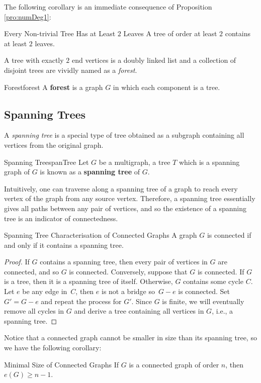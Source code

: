 \documentclass[math]{amznotes}
\theoremstyle{remark}
\newcommand{\0}{\mathbf{0}}
\newcommand{\1}{\mathbf{1}}
\begin{document}
The following corollary is an immediate consequence of Proposition \ref{pro:numDeg1}:
\begin{corbox}{Every Non-trivial Tree Has at Least $2$ Leaves}{}
    A tree of order at least $2$ contains at least $2$ leaves.
\end{corbox}
A tree with exactly $2$ end vertices is a doubly linked list and a collection of disjoint trees are vividly named as a \textit{forest}.
\begin{dfnbox}{Forest}{forest}
    A {\color{red} \textbf{forest}} is a graph $G$ in which each component is a tree.
\end{dfnbox}

\subsection{Spanning Trees}
A \textit{spanning tree} is a special type of tree obtained as a subgraph containing all vertices from the original graph.
\begin{dfnbox}{Spanning Tree}{spanTree}
    Let $G$ be a multigraph, a tree $T$ which is a spanning graph of $G$ is known as a {\color{red} \textbf{spanning tree}} of $G$.
\end{dfnbox}
Intuitively, one can traverse along a spanning tree of a graph to reach every vertex of the graph from any source vertex. Therefore, a spanning tree essentially gives all paths between any pair of vertices, and so the existence of a spanning tree is an indicator of connectedness.
\begin{probox}{Spanning Tree Characterisation of Connected Graphs}{}
    A graph $G$ is connected if and only if it contains a spanning tree.
    \tcblower
    \begin{proof}
        If $G$ contains a spanning tree, then every pair of vertices in $G$ are connected, and so $G$ is connected. Conversely, suppose that $G$ is connected. If $G$ is a tree, then it is a spanning tree of itself. Otherwise, $G$ contains some cycle $C$. Let $e$ be any edge in~$C$, then $e$ is not a bridge so~$G - e$ is connected. Set $G' = G - e$ and repeat the process for $G'$. Since $G$ is finite, we will eventually remove all cycles in $G$ and derive a tree containing all vertices in $G$, i.e., a spanning tree.
    \end{proof}
\end{probox}
Notice that a connected graph cannot be smaller in size than its spanning tree, so we have the following corollary:
\begin{corbox}{Minimal Size of Connected Graphs}{}
    If $G$ is a connected graph of order $n$, then $e(G) \geq n - 1$.
\end{corbox}
\end{document}
